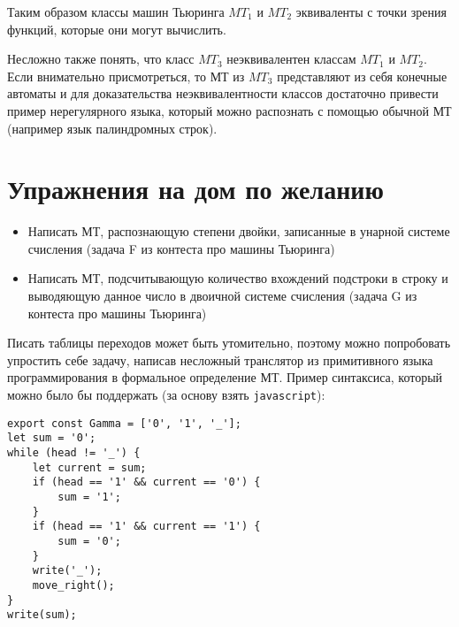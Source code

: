\documentclass[
    11pt,
    a4paper
]{article}
\theoremstyle{definition}
\begin{document}
Таким образом классы машин Тьюринга $MT_1$ и $MT_2$ эквиваленты с точки зрения функций, которые они могут вычислить.

Несложно также понять, что класс $MT_3$ неэквивалентен классам $MT_1$ и $MT_2$. Если внимательно присмотреться, то МТ из $MT_3$ представляют из себя конечные автоматы и для доказательства неэквивалентности классов достаточно привести пример нерегулярного языка, который можно распознать с помощью обычной МТ (например язык палиндромных строк).

\section{Упражнения на дом по желанию}

\begin{itemize}
\item Написать МТ, распознающую степени двойки, записанные в унарной системе счисления (задача F из контеста про машины Тьюринга)
\item Написать МТ, подсчитывающую количество вхождений подстроки в строку и выводяющую данное число в двоичной системе счисления (задача G из контеста про машины Тьюринга)
\end{itemize}

Писать таблицы переходов может быть утомительно, поэтому можно попробовать упростить себе задачу, написав несложный транслятор из примитивного языка программирования в формальное определение МТ. Пример синтаксиса, который можно было бы поддержать (за основу взять \texttt{javascript}):

\begin{verbatim}
export const Gamma = ['0', '1', '_'];
let sum = '0';
while (head != '_') {
    let current = sum;
    if (head == '1' && current == '0') {
        sum = '1';
    }
    if (head == '1' && current == '1') {
        sum = '0';
    }
    write('_');
    move_right();
}
write(sum);

\end{verbatim}
\end{document}
